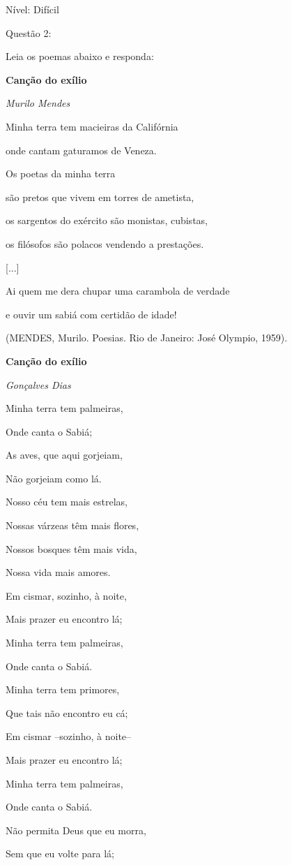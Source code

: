 {Nível: Difícil

Questão 2:

Leia os poemas abaixo e responda:

\textbf{Canção do exílio}

\emph{Murilo Mendes}

Minha terra tem macieiras da Califórnia

onde cantam gaturamos de Veneza.

Os poetas da minha terra

são pretos que vivem em torres de ametista,

os sargentos do exército são monistas, cubistas,

os filósofos são polacos vendendo a prestações.

{[}...{]}

Ai quem me dera chupar uma carambola de verdade

e ouvir um sabiá com certidão de idade!

(MENDES, Murilo. Poesias. Rio de Janeiro: José Olympio, 1959).

\textbf{Canção do exílio}

\emph{Gonçalves Dias}

Minha terra tem palmeiras,

Onde canta o Sabiá;

As aves, que aqui gorjeiam,

Não gorjeiam como lá.

Nosso céu tem mais estrelas,

Nossas várzeas têm mais flores,

Nossos bosques têm mais vida,

Nossa vida mais amores.

Em cismar, sozinho, à noite,

Mais prazer eu encontro lá;

Minha terra tem palmeiras,

Onde canta o Sabiá.

Minha terra tem primores,

Que tais não encontro eu cá;

Em cismar --sozinho, à noite--

Mais prazer eu encontro lá;

Minha terra tem palmeiras,

Onde canta o Sabiá.

Não permita Deus que eu morra,

Sem que eu volte para lá;

}
